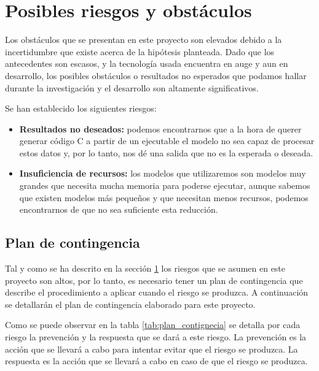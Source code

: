 \section{Posibles riesgos y obstáculos}
\label{sec:riesgos}


Los obstáculos que se presentan en este proyecto son elevados debido a la incertidumbre
que existe acerca de la hipótesis planteada. Dado que los antecedentes son escasos, y
la tecnología usada encuentra en auge y aun en desarrollo, los posibles obstáculos
o resultados no esperados que podamos hallar durante la investigación y el desarrollo
son altamente significativos.

Se han establecido los siguientes riesgos:

\begin{itemize}
    \item \textbf{Resultados no deseados:} podemos encontrarnos que a la hora de querer
        generar código C a partir de un ejecutable el modelo no sea capaz de procesar estos datos
        y, por lo tanto, nos dé una salida que no es la esperada o deseada.
    \item \textbf{Insuficiencia de recursos:} los modelos que utilizaremos son modelos
        muy grandes que necesita mucha memoria para poderse ejecutar, aunque sabemos que
        existen modelos más pequeños y que necesitan menos recursos, podemos encontrarnos de
        que no sea suficiente esta reducción.
\end{itemize}

\subsection{Plan de contingencia}
\label{subsec:planContingencia}


Tal y como se ha descrito en la sección \ref{sec:riesgos} los riesgos que se asumen en este
proyecto son altos, por lo tanto, es necesario tener un plan de contingencia que describe
el procedimiento a aplicar cuando el riesgo se produzca. A continuación se detallarán
el plan de contingencia elaborado para este proyecto.

Como se puede observar en la tabla \ref{tab:plan_contignecia} se detalla por cada riesgo
la prevención y la respuesta que se dará a este riesgo. La prevención es la acción que se
llevará a cabo para intentar evitar que el riesgo se produzca. La respuesta es la acción
que se llevará a cabo en caso de que el riesgo se produzca.

